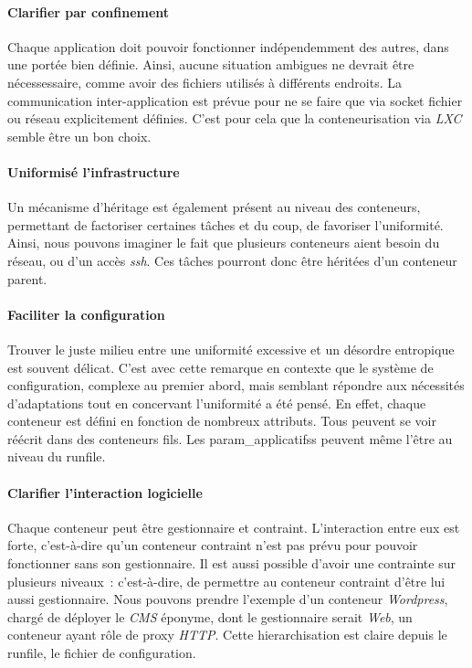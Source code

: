 \paragraph{Clarifier par confinement}
Chaque \gls{application} doit pouvoir fonctionner indépendemment des autres, dans une portée bien définie.
Ainsi, aucune situation ambigues ne devrait être nécessessaire, comme avoir des fichiers utilisés à différents endroits.
La communication inter-application est prévue pour ne se faire que via socket fichier ou réseau explicitement définies.
C'est pour cela que la conteneurisation via \emph{LXC} semble être un bon choix.

\paragraph{Uniformisé l'infrastructure}
Un mécanisme d'héritage est également présent au niveau des \glspl{conteneur}, permettant de factoriser certaines tâches et du coup, de favoriser l'uniformité.
Ainsi, nous pouvons imaginer le fait que plusieurs conteneurs aient besoin du réseau, ou d'un accès \emph{ssh}.
Ces tâches pourront donc être héritées d'un conteneur parent.

\paragraph{Faciliter la configuration}
Trouver le juste milieu entre une uniformité excessive et un désordre entropique est souvent délicat.
C'est avec cette remarque en contexte que le système de configuration, complexe au premier abord, mais semblant répondre aux nécessités d'adaptations tout en concervant l'uniformité a été pensé.
En effet, chaque \gls{conteneur} est défini en fonction de nombreux \glspl{attribut}.
Tous peuvent se voir réécrit dans des conteneurs fils.
Les \glspl{param_applicatifs} peuvent même l'être au niveau du \gls{runfile}.

\paragraph{Clarifier l'interaction logicielle}
Chaque \gls{conteneur} peut être \gls{gestionnaire} et \gls{contraint}.
L'interaction entre eux est forte, c'est-à-dire qu'un conteneur contraint n'est pas prévu pour pouvoir fonctionner sans son gestionnaire.
Il est aussi possible d'avoir une contrainte sur plusieurs niveaux~: c'est-à-dire, de permettre au conteneur contraint d'être lui aussi gestionnaire.
Nous pouvons prendre l'exemple d'un conteneur \emph{Wordpress}, chargé de déployer le \emph{CMS} éponyme, dont le gestionnaire serait \emph{Web}, un conteneur ayant rôle de proxy \emph{HTTP}.
Cette hierarchisation est claire depuis le \gls{runfile}, le fichier de configuration.

